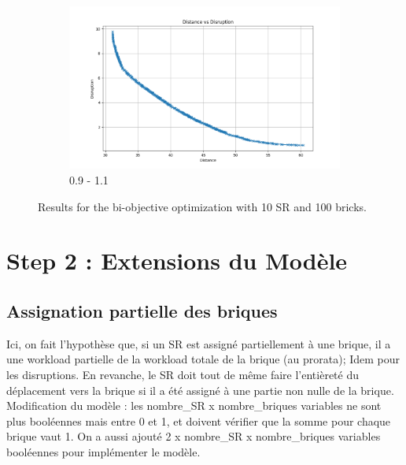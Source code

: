 \documentclass[12pt,a4paper]{article}
\begin{document}
\begin{figure}[H]
\begin{subfigure}{0.32\textwidth}
        \label{fig:solve2}
    \end{subfigure}
    \hfill
    \begin{subfigure}{0.32\textwidth}
        \centering
        \includegraphics[width=\textwidth]{figures/solve1-100-0.9.png}
        \caption{0.9 - 1.1}
        \label{fig:solve3}
    \end{subfigure}
    \caption{Results for the bi-objective optimization with 10 SR and 100 bricks.}
    \label{fig:all_solves}
\end{figure}

\section*{Step 2 : Extensions du Modèle}

\subsection*{Assignation partielle des briques}
Ici, on fait l'hypothèse que, si un SR est assigné partiellement à une brique, il a une workload partielle de la workload totale de la brique (au prorata); Idem pour les disruptions. En revanche, le SR doit tout de même faire l'entièreté du déplacement vers la brique si il a été assigné à une partie non nulle de la brique.
\\
Modification du modèle : les nombre\_SR x nombre\_briques variables ne sont plus booléennes mais entre 0 et 1, et doivent vérifier que la somme pour chaque brique vaut 1.
On a aussi ajouté 2 x nombre\_SR x nombre\_briques variables booléennes pour implémenter le modèle.
\\
\end{document}
